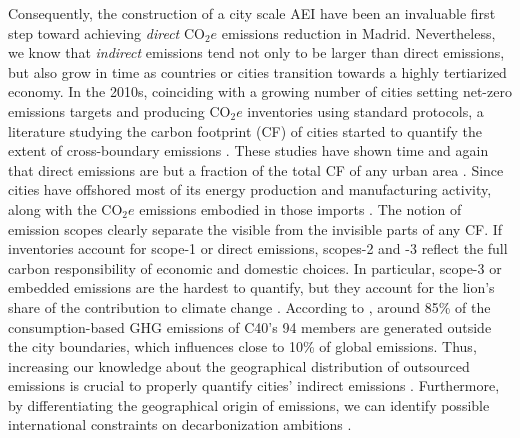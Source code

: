 \documentclass[
  10pt,
  twocolumn]{aft}
\begin{document}
Consequently, the construction of a city scale AEI have been an
invaluable first step toward achieving \emph{direct} \(\text{CO}_2e\)
emissions reduction in Madrid. Nevertheless, we know that
\emph{indirect} emissions tend not only to be larger than direct
emissions, but also grow in time as countries or cities transition
towards a highly tertiarized economy. In the 2010s, coinciding with a
growing number of cities setting net-zero emissions targets and
producing \(\text{CO}_2e\) inventories using standard protocols, a
literature studying the carbon footprint (CF) of cities started to
quantify the extent of cross-boundary emissions
\citep{wiedmann_city_2021}. These studies have shown time and again that
direct emissions are but a fraction of the total CF of any urban area
\citep{wiedmann_threescope_2021, wiedmann_city_2021, c40_future_2019, eea_environmental_2013}.
Since cities have offshored most of its energy production and
manufacturing activity, along with the \(\text{CO}_2e\) emissions
embodied in those imports \citep{wiedmann_threescope_2021}. The notion
of emission scopes clearly separate the visible from the invisible parts
of any CF. If inventories account for scope-1 or direct emissions,
scopes-2 and -3 reflect the full carbon responsibility of economic and
domestic choices. In particular, scope-3 or embedded emissions are the
hardest to quantify, but they account for the lion's share of the
contribution to climate change
\citep{creutzig_demand-side_2022, wiedmann_city_2021, chen_urban_2020, moran_carbon_2018, ivanova_mapping_2017, wiedmann_concept_2016, kennedy_egregious_2014}.
According to \citet[p.~16]{c40_future_2019}, around 85\% of the
consumption-based GHG emissions of C40's 94 members are generated
outside the city boundaries, which influences close to 10\% of global
emissions. Thus, increasing our knowledge about the geographical
distribution of outsourced emissions is crucial to properly quantify
cities' indirect emissions
\citep{wiedmann_threescope_2021, eea_environmental_2013}. Furthermore,
by differentiating the geographical origin of emissions, we can identify
possible international constraints on decarbonization ambitions
\citep{remond-tiedrez_eu_2019}.
\end{document}
